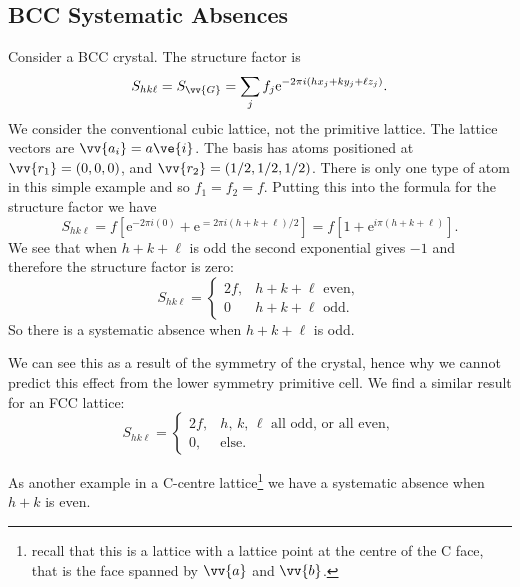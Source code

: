 \documentclass[fleqn]{NotesClass}
\newcommand*{\e}{\mathrm{e}}
\begin{document}
    \subsection{BCC Systematic Absences}
    Consider a BCC crystal.
    The structure factor is
    \begin{equation}
        S_{hk\ell} = S_{\vv{G}} = \sum_j f_j \e^{-2\pi i(hx_j + ky_j + \ell z_j)}.
    \end{equation}
    We consider the conventional cubic lattice, not the primitive lattice.
    The lattice vectors are \(\vv{a_i} = a\ve{i}\).
    The basis has atoms positioned at \(\vv{r_1} = (0, 0, 0)\), and \(\vv{r_2} = (1/2, 1/2, 1/2)\).
    There is only one type of atom in this simple example and so \(f_1 = f_2 = f\).
    Putting this into the formula for the structure factor we have
    \begin{equation}
        S_{hk\ell} = f[\e^{-2\pi i(0)} + \e^{=2\pi i (h + k + \ell)/2}] = f[1 + \e^{i\pi(h + k + \ell)}].
    \end{equation}
    We see that when \(h + k + \ell\) is odd the second exponential gives \(-1\) and therefore the structure factor is zero:
    \begin{equation}
        S_{hk\ell} = 
        \begin{cases}
            2f, & h + k + \ell \text{ even},\\
            0 & h + k + \ell \text{ odd}.
        \end{cases}
    \end{equation}
    So there is a systematic absence when \(h + k + \ell\) is odd.
    
    We can see this as a result of the symmetry of the crystal, hence why we cannot predict this effect from the lower symmetry primitive cell.
    We find a similar result for an FCC lattice:
    \begin{equation}
        S_{hk\ell} = 
        \begin{cases}
            2f, & \text{\(h\), \(k\), \(\ell\) all odd, or all even},\\
            0, & \text{else}.
        \end{cases}
    \end{equation}
    
    As another example in a C-centre lattice\footnote{recall that this is a lattice with a lattice point at the centre of the C face, that is the face spanned by \(\vv{a}\) and \(\vv{b}\).} we have a systematic absence when \(h + k\) is even.
    
\end{document}
